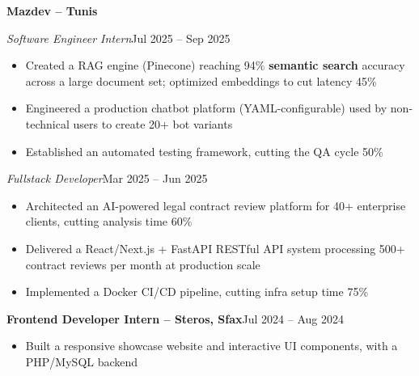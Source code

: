 \documentclass[10pt,a4paper]{article}
\newcommand{\entry}[2]{\vspace{1pt}\noindent\textbf{#1}\hfill{\color{muted}#2}\par}
\newcommand{\subentry}[2]{\noindent\textit{#1}\hfill{\color{muted}#2}\par}
\begin{document}
\entry{Mazdev -- Tunis}{}
\subentry{Software Engineer Intern}{Jul 2025 -- Sep 2025}
\begin{itemize}
  \item Created a RAG engine (Pinecone) reaching 94\% \textbf{semantic search} accuracy across a large document set; optimized embeddings to cut latency 45\%
  \item Engineered a production chatbot platform (YAML-configurable) used by non-technical users to create 20+ bot variants
  \item Established an automated testing framework, cutting the QA cycle 50\%
\end{itemize}
\subentry{Fullstack Developer}{Mar 2025 -- Jun 2025}
\begin{itemize}
  \item Architected an AI-powered legal contract review platform for 40+ enterprise clients, cutting analysis time 60\%
  \item Delivered a React/Next.js + FastAPI RESTful API system processing 500+ contract reviews per month at production scale
  \item Implemented a Docker CI/CD pipeline, cutting infra setup time 75\%
\end{itemize}

\entry{Frontend Developer Intern -- Steros, Sfax}{Jul 2024 -- Aug 2024}
\begin{itemize}
  \item Built a responsive showcase website and interactive UI components, with a PHP/MySQL backend
\end{itemize}
\end{document}

